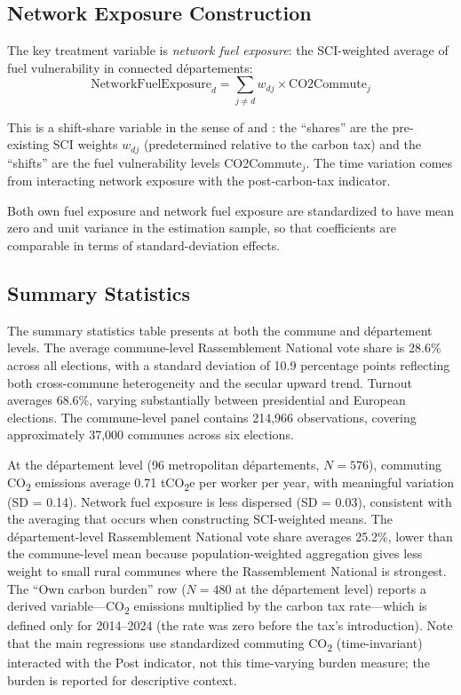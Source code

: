 \documentclass[12pt]{article}
\newcommand{\rn}{Rassemblement National}
\newcommand{\dept}{d\'{e}partement}
\newcommand{\depts}{d\'{e}partements}
\begin{document}
\subsection{Network Exposure Construction}

The key treatment variable is \textit{network fuel exposure}: the SCI-weighted average of fuel vulnerability in connected \depts{}:
\begin{equation}
\text{NetworkFuelExposure}_d = \sum_{j \neq d} w_{dj} \times \text{CO2Commute}_j
\label{eq:network_exposure}
\end{equation}

This is a shift-share variable in the sense of \citet{goldsmith2020bartik} and \citet{borusyak2022quasi}: the ``shares'' are the pre-existing SCI weights $w_{dj}$ (predetermined relative to the carbon tax) and the ``shifts'' are the fuel vulnerability levels CO2Commute$_j$. The time variation comes from interacting network exposure with the post-carbon-tax indicator.

Both own fuel exposure and network fuel exposure are standardized to have mean zero and unit variance in the estimation sample, so that coefficients are comparable in terms of standard-deviation effects.

\subsection{Summary Statistics}



The summary statistics table presents at both the commune and \dept{} levels. The average commune-level \rn{} vote share is 28.6\% across all elections, with a standard deviation of 10.9 percentage points reflecting both cross-commune heterogeneity and the secular upward trend. Turnout averages 68.6\%, varying substantially between presidential and European elections. The commune-level panel contains 214,966 observations, covering approximately 37,000 communes across six elections.

At the \dept{} level (96 metropolitan \depts{}, $N = 576$), commuting CO\textsubscript{2} emissions average 0.71 tCO\textsubscript{2}e per worker per year, with meaningful variation (SD = 0.14). Network fuel exposure is less dispersed (SD = 0.03), consistent with the averaging that occurs when constructing SCI-weighted means. The \dept{}-level \rn{} vote share averages 25.2\%, lower than the commune-level mean because population-weighted aggregation gives less weight to small rural communes where the \rn{} is strongest. The ``Own carbon burden'' row ($N = 480$ at the \dept{} level) reports a derived variable---CO\textsubscript{2} emissions multiplied by the carbon tax rate---which is defined only for 2014--2024 (the rate was zero before the tax's introduction). Note that the main regressions use standardized commuting CO\textsubscript{2} (time-invariant) interacted with the Post indicator, not this time-varying burden measure; the burden is reported for descriptive context.
\end{document}
